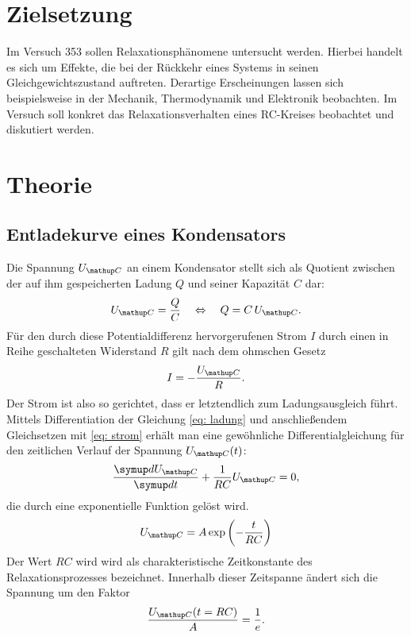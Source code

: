 \setcounter{page}{1}
\section*{Zielsetzung}
Im Versuch 353 sollen Relaxationsphänomene untersucht werden. Hierbei handelt es sich um Effekte, die bei der Rückkehr eines
Systems in seinen Gleichgewichtszustand auftreten. Derartige Erscheinungen lassen sich beispielsweise in der Mechanik, Thermodynamik
und Elektronik beobachten. Im Versuch soll konkret das Relaxationsverhalten eines RC-Kreises beobachtet und diskutiert werden.
\section{Theorie}
\subsection{Entladekurve eines Kondensators}
Die Spannung $U\ua{C}$ an einem Kondensator stellt sich als Quotient zwischen der auf ihm gespeicherten Ladung $Q$ und seiner Kapazität $C$ dar:
\begin{equation}
  U\ua{C} = \frac{Q}{C} \quad \Leftrightarrow \quad Q = C\, U\ua{C}.
  \label{eq: ladung}
\end{equation}
Für den durch diese Potentialdifferenz hervorgerufenen Strom $I$ durch einen in Reihe geschalteten Widerstand $R$ gilt nach dem ohmschen Gesetz
\begin{equation}
  I = -\frac{U\ua{C}}{R}.
  \label{eq: strom}
\end{equation}
Der Strom ist also so gerichtet, dass er letztendlich zum Ladungsausgleich führt. Mittels Differentiation der Gleichung \eqref{eq: ladung} und anschließendem
Gleichsetzen mit \eqref{eq: strom} erhält
man eine gewöhnliche Differentialgleichung für den zeitlichen Verlauf der Spannung $U\ua{C}(t)$:
\begin{equation}
  \frac{\dif{U\ua{C}}}{\dif{t}} + \frac{1}{RC}U\ua{C} = 0,
\end{equation}
die durch eine exponentielle Funktion gelöst wird.
\begin{equation}
  \label{eq:entlade_kurve}
  U\ua{C} = A \exp\left(-\frac{t}{RC}\right)
\end{equation}
Der Wert $RC$ wird wird als charakteristische Zeitkonstante des Relaxationsprozesses bezeichnet. Innerhalb dieser Zeitspanne ändert
sich die Spannung um den Faktor
\begin{equation}
  \frac{U\ua{C}(t = RC)}{A} = \frac{1}{e}.
\end{equation}
